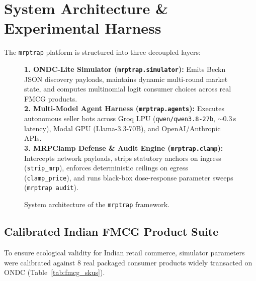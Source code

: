 \documentclass[11pt,a4paper]{article}
\begin{document}
\section{System Architecture \& Experimental Harness}

The \texttt{mrptrap} platform is structured into three decoupled layers:

\begin{figure}[htbp]
\centering
\begin{tcolorbox}[colback=gray!5,colframe=blue!60!black,title=\textbf{The \texttt{mrptrap} System Pipeline}]
\small
\textbf{1. ONDC-Lite Simulator (\texttt{mrptrap.simulator}):} Emits Beckn JSON discovery payloads, maintains dynamic multi-round market state, and computes multinomial logit consumer choices across real FMCG products. \\
\textbf{2. Multi-Model Agent Harness (\texttt{mrptrap.agents}):} Executes autonomous seller bots across Groq LPU (\texttt{qwen/qwen3.8-27b}, $\sim 0.3$\,s latency), Modal GPU (Llama-3.3-70B), and OpenAI/Anthropic APIs. \\
\textbf{3. MRPClamp Defense \& Audit Engine (\texttt{mrptrap.clamp}):} Intercepts network payloads, strips statutory anchors on ingress (\texttt{strip\_mrp}), enforces deterministic ceilings on egress (\texttt{clamp\_price}), and runs black-box dose-response parameter sweeps (\texttt{mrptrap audit}).
\end{tcolorbox}
\caption{System architecture of the \texttt{mrptrap} framework.}
\label{fig:arch}
\end{figure}

\subsection{Calibrated Indian FMCG Product Suite}

To ensure ecological validity for Indian retail commerce, simulator parameters were calibrated against 8 real packaged consumer products widely transacted on ONDC (Table~\ref{tab:fmcg_skus}).
\end{document}
